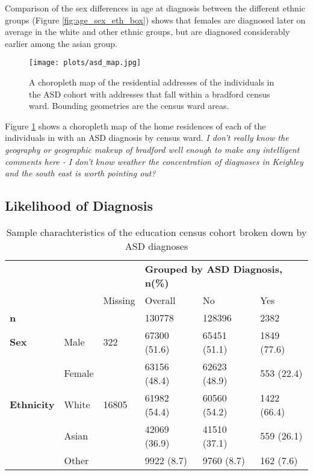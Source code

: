 \documentclass[
]{article}
\begin{document}
Comparison of the sex differences in age at diagnosis between the
different ethnic groups (Figure \ref{fig:age_sex_eth_box}) shows that
females are diagnosed later on average in the white and other ethnic
groups, but are diagnosed considerably earlier among the asian group.

\begin{figure}[H]
\centering
\texttt{[image: plots/asd\_map.jpg]}
\caption{A choropleth map of the residential addresses of the individuals in the ASD cohort with addresses that fall within a bradford census ward. Bounding geometries are the census ward areas.}
\label{fig:asd_map}
\end{figure}

Figure \ref{fig:asd_map} shows a choropleth map of the home residences
of each of the individuals in with an ASD diagnosis by census ward.
\textit{I don't really know the geography or geographic makeup of bradford well enough to make any intelligent comments here - I don't know weather the concentration of diagnoses in Keighley and the south east is worth pointing out?}

\hypertarget{likelihood-of-diagnosis}{%
\subsection{Likelihood of Diagnosis}\label{likelihood-of-diagnosis}}

\begin{table}[H]
\centering
\begin{scriptsize}
\begin{tabular}{llllll}
\toprule
            & & & \multicolumn{3}{l}{\textbf{Grouped by ASD Diagnosis, n(\%)}} \\[1mm]
            & & Missing & Overall & No & Yes \\
\midrule
\textbf{n} & {} & & 130778 & 128396 & 2382 \\[2mm]
\textbf{Sex} & Male & 322 & 67300 (51.6) &  65451 (51.1) & 1849 (77.6) \\
& Female & & 63156 (48.4) & 62623 (48.9) & 553 (22.4) \\[2mm]
\textbf{Ethnicity} & White & 16805 & 61982 (54.4) & 60560 (54.2) & 1422 (66.4) \\
            & Asian & & 42069 (36.9) & 41510 (37.1) & 559 (26.1) \\
            & Other & & 9922 (8.7) & 9760 (8.7) & 162 (7.6) \\[2mm]
\bottomrule
\end{tabular}
\end{scriptsize}
\caption{Sample charachteristics of the education census cohort broken down by ASD diagnoses}
\label{tab:census_cohort}
\end{table}
\end{document}
